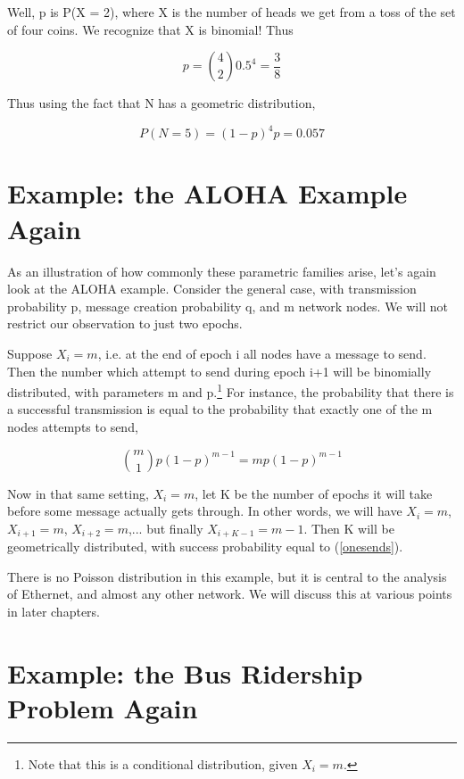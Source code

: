 Well, p is P(X = 2), where X is the number of heads we get from a toss
of the set of four coins.  We recognize that X is binomial!  Thus

\begin{equation}
p = \binom{4}{2} 0.5^4 = \frac{3}{8}
\end{equation}

Thus using the fact that N has a geometric distribution,

\begin{equation}
P(N = 5) = (1-p)^4 p = 0.057
\end{equation}

\section{Example:  the ALOHA Example Again}
\label{alohaagain}

As an illustration of how commonly these parametric families arise,
let's again look at the ALOHA example.  Consider the general case, with
transmission probability p, message creation probability q, and m
network nodes.  We will not restrict our observation to just two epochs.

Suppose $X_i = m$, i.e. at the end of epoch i all nodes have a message
to send.  Then the number which attempt to send during epoch i+1 will be
binomially distributed, with parameters m and p.\footnote{Note that
this is a conditional distribution, given $X_i = m$.}  For instance, the
probability that there is a successful transmission is equal to the
probability that exactly one of the m nodes attempts to send,

\begin{equation}
\label{onesends}
\binom{m}{1} p (1-p)^{m-1} = mp(1-p)^{m-1}
\end{equation}

Now in that same setting, $X_i = m$, let K be the number of epochs it
will take before some message actually gets through.  In other words, we
will have $X_i = m$, $X_{i+1} = m$, $X_{i+2} = m$,...  but finally
$X_{i+K-1} = m-1$.  Then K will be geometrically distributed, with
success probability equal to (\ref{onesends}).

There is no Poisson distribution in this example, but it is central to
the analysis of Ethernet, and almost any other network.  We will discuss
this at various points in later chapters.

\section{Example:  the Bus Ridership Problem Again}

